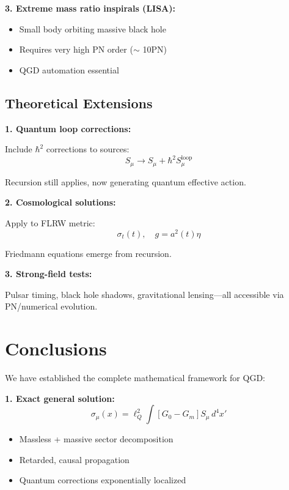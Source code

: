 \documentclass[11pt,a4paper]{article}
\theoremstyle{definition}
\theoremstyle{remark}
\begin{document}
		\textbf{3. Extreme mass ratio inspirals (LISA):}
		\begin{itemize}
			\item Small body orbiting massive black hole
			\item Requires very high PN order ($\sim$ 10PN)
			\item QGD automation essential
		\end{itemize}
		
		\subsection{Theoretical Extensions}
		
		\textbf{1. Quantum loop corrections:}
		
		Include $\hbar^2$ corrections to sources:
		\begin{equation}
			S_\mu \to S_\mu + \hbar^2 S_\mu^{\text{loop}}
		\end{equation}
		
		Recursion still applies, now generating quantum effective action.
		
		\textbf{2. Cosmological solutions:}
		
		Apply to FLRW metric:
		\begin{equation}
			\sigma_t(t), \quad g = a^2(t)\eta
		\end{equation}
		
		Friedmann equations emerge from recursion.
		
		\textbf{3. Strong-field tests:}
		
		Pulsar timing, black hole shadows, gravitational lensing—all accessible via PN/numerical evolution.
		
		\section{Conclusions}
		
		We have established the complete mathematical framework for QGD:
		
		\textbf{1. Exact general solution:}
		\begin{equation}
			\sigma_\mu(x) = \ell_Q^2\int [G_0 - G_m]S_\mu \,d^4x'
		\end{equation}
		\begin{itemize}
			\item Massless + massive sector decomposition
			\item Retarded, causal propagation
			\item Quantum corrections exponentially localized
		\end{itemize}
		
\end{document}
